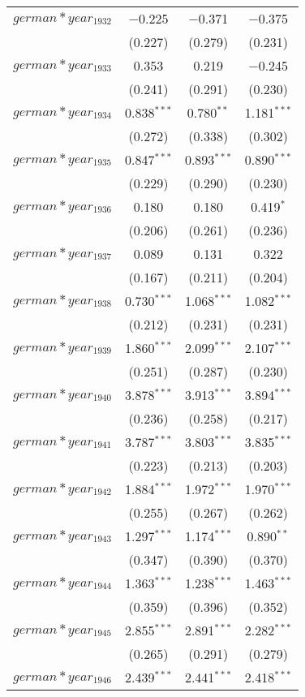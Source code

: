 \begin{table}[!h]
\begin{tabular}{@{\extracolsep{5pt}}lccc}
  $german*year_1932$ & $-$0.225 & $-$0.371 & $-$0.375 \\ 
  & (0.227) & (0.279) & (0.231) \\ 
  $german*year_1933$ & 0.353 & 0.219 & $-$0.245 \\ 
  & (0.241) & (0.291) & (0.230) \\ 
  $german*year_1934$ & 0.838$^{***}$ & 0.780$^{**}$ & 1.181$^{***}$ \\ 
  & (0.272) & (0.338) & (0.302) \\ 
  $german*year_1935$ & 0.847$^{***}$ & 0.893$^{***}$ & 0.890$^{***}$ \\ 
  & (0.229) & (0.290) & (0.230) \\ 
  $german*year_1936$ & 0.180 & 0.180 & 0.419$^{*}$ \\ 
  & (0.206) & (0.261) & (0.236) \\ 
  $german*year_1937$ & 0.089 & 0.131 & 0.322 \\ 
  & (0.167) & (0.211) & (0.204) \\ 
  $german*year_1938$ & 0.730$^{***}$ & 1.068$^{***}$ & 1.082$^{***}$ \\ 
  & (0.212) & (0.231) & (0.231) \\ 
  $german*year_1939$ & 1.860$^{***}$ & 2.099$^{***}$ & 2.107$^{***}$ \\ 
  & (0.251) & (0.287) & (0.230) \\ 
  $german*year_1940$ & 3.878$^{***}$ & 3.913$^{***}$ & 3.894$^{***}$ \\ 
  & (0.236) & (0.258) & (0.217) \\ 
  $german*year_1941$ & 3.787$^{***}$ & 3.803$^{***}$ & 3.835$^{***}$ \\ 
  & (0.223) & (0.213) & (0.203) \\ 
  $german*year_1942$ & 1.884$^{***}$ & 1.972$^{***}$ & 1.970$^{***}$ \\ 
  & (0.255) & (0.267) & (0.262) \\ 
  $german*year_1943$ & 1.297$^{***}$ & 1.174$^{***}$ & 0.890$^{**}$ \\ 
  & (0.347) & (0.390) & (0.370) \\ 
  $german*year_1944$ & 1.363$^{***}$ & 1.238$^{***}$ & 1.463$^{***}$ \\ 
  & (0.359) & (0.396) & (0.352) \\ 
  $german*year_1945$ & 2.855$^{***}$ & 2.891$^{***}$ & 2.282$^{***}$ \\ 
  & (0.265) & (0.291) & (0.279) \\ 
  $german*year_1946$ & 2.439$^{***}$ & 2.441$^{***}$ & 2.418$^{***}$ \\ 

\end{tabular}
\end{table}
